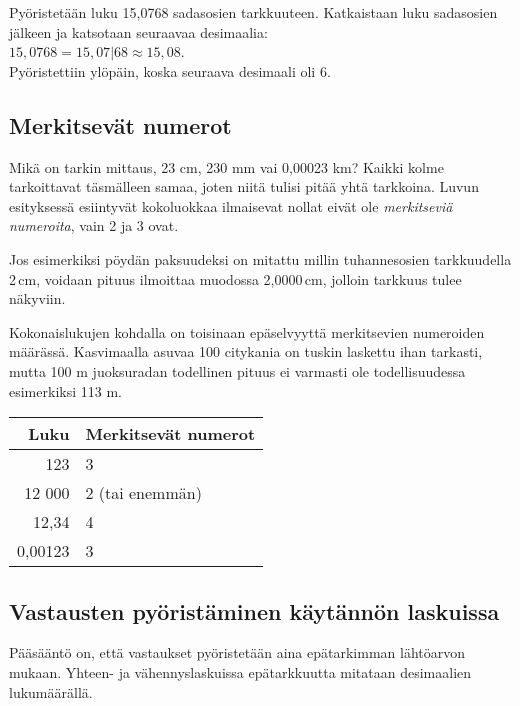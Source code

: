 \begin{esimerkki}
Pyöristetään luku 15,0768 sadasosien tarkkuuteen. Katkaistaan
luku sadasosien jälkeen ja katsotaan seuraavaa desimaalia:\\
$15,0768 = 15,07|68 \approx 15,08$.\\
Pyöristettiin ylöpäin, koska seuraava desimaali oli 6.
\end{esimerkki}


\subsection*{Merkitsevät numerot}

Mikä on tarkin mittaus, 23 cm, 230 mm vai 0,00023 km? Kaikki kolme tarkoittavat täsmälleen samaa, joten niitä tulisi pitää
yhtä tarkkoina. Luvun esityksessä esiintyvät kokoluokkaa ilmaisevat nollat eivät ole \emph{merkitseviä numeroita}, vain
2 ja 3 ovat.


Jos esimerkiksi pöydän paksuudeksi on mitattu millin tuhannesosien
tarkkuudella 2\,cm, voidaan pituus ilmoittaa muodossa 2,0000\,cm, jolloin tarkkuus tulee näkyviin. 

Kokonaislukujen kohdalla on toisinaan epäselvyyttä merkitsevien numeroiden määrässä. Kasvimaalla asuvaa 100 citykania on tuskin laskettu ihan tarkasti,
mutta 100 m juoksuradan todellinen pituus ei varmasti ole todellisuudessa
esimerkiksi 113 m.

\begin{center}
\begin{tabular}{r|l}
Luku & Merkitsevät numerot \\
\hline
123 & 3 \\
12 000 & 2 (tai enemmän)\\
12,34 & 4 \\
0,00123 & 3
\end{tabular}
\end{center}

\subsection*{Vastausten pyöristäminen käytännön laskuissa}

Pääsääntö on, että vastaukset pyöristetään aina epätarkimman
lähtöarvon mukaan. Yhteen- ja vähennyslaskuissa epätarkkuutta
mitataan desimaalien lukumäärällä.

